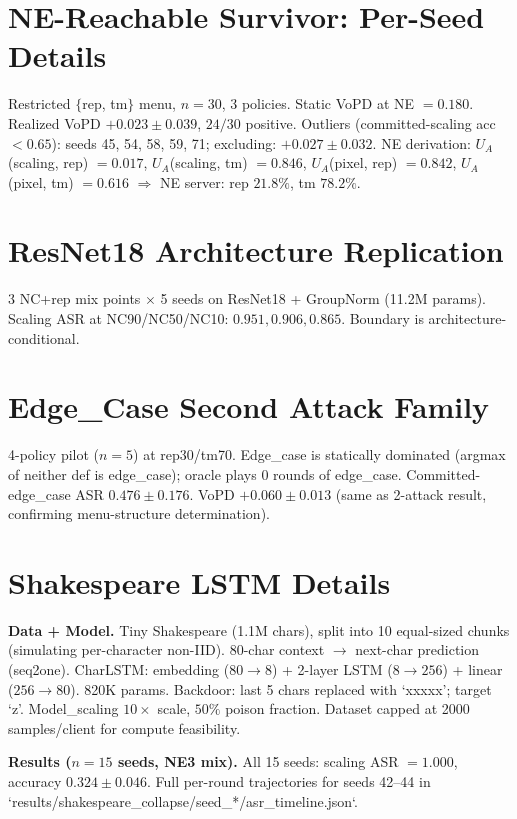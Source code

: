 \documentclass{article}
\begin{document}
\section{NE-Reachable Survivor: Per-Seed Details}
\label{app:ne_survivor}
Restricted $\{$rep, tm$\}$ menu, $n=30$, 3 policies. Static VoPD at NE $=0.180$. Realized VoPD $+0.023\pm0.039$, $24/30$ positive. Outliers (committed-scaling acc $<0.65$): seeds 45, 54, 58, 59, 71; excluding: $+0.027\pm0.032$. NE derivation: $U_A$(scaling, rep) $=0.017$, $U_A$(scaling, tm) $=0.846$, $U_A$(pixel, rep) $=0.842$, $U_A$(pixel, tm) $=0.616$ $\Rightarrow$ NE server: rep $21.8\%$, tm $78.2\%$.

\section{ResNet18 Architecture Replication}
\label{app:resnet18}
3 NC+rep mix points $\times$ 5 seeds on ResNet18 + GroupNorm (11.2M params). Scaling ASR at NC90/NC50/NC10: $0.951, 0.906, 0.865$. Boundary is architecture-conditional.

\section{Edge\_Case Second Attack Family}
\label{app:edgecase}
4-policy pilot ($n=5$) at rep30/tm70. Edge\_case is statically dominated (argmax of neither def is edge\_case); oracle plays 0 rounds of edge\_case. Committed-edge\_case ASR $0.476\pm0.176$. VoPD $+0.060\pm0.013$ (same as 2-attack result, confirming menu-structure determination).

\section{Shakespeare LSTM Details}
\label{app:shakespeare}
\textbf{Data + Model.} Tiny Shakespeare (1.1M chars), split into 10 equal-sized chunks (simulating per-character non-IID). 80-char context $\to$ next-char prediction (seq2one). CharLSTM: embedding ($80\to8$) + 2-layer LSTM ($8\to256$) + linear ($256\to80$). 820K params. Backdoor: last 5 chars replaced with `xxxxx'; target `z'. Model\_scaling $10\times$ scale, $50\%$ poison fraction. Dataset capped at 2000 samples/client for compute feasibility.

\textbf{Results ($n=15$ seeds, NE3 mix).} All 15 seeds: scaling ASR $=1.000$, accuracy $0.324\pm0.046$. Full per-round trajectories for seeds 42--44 in `results/shakespeare\_collapse/seed\_*/asr\_timeline.json`.
\end{document}
